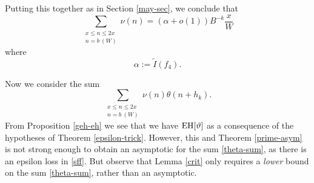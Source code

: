 Putting this together as in Section \ref{may-sec}, we conclude that
$$ \sum_{\substack{x \leq n \leq 2x\\ n = b\ (W)}} \nu(n) = (\alpha + o(1)) B^{-k} \frac{x}{W}$$
where 
$$ \alpha := \tilde I(f_4).$$

Now we consider the sum
\begin{equation}\label{theta-sum}
 \sum_{\substack{x \leq n \leq 2x\\ n = b\ (W)}} \nu(n) \theta(n+h_k).
\end{equation}
From Proposition \ref{geh-eh} we see that we have $\operatorname*{EH}[\vartheta]$ as a consequence of the hypotheses of Theorem \ref{epsilon-trick}.  However, this and Theorem \ref{prime-asym} is not strong enough to obtain an asymptotic for the sum \eqref{theta-sum}, as there is an epsilon loss in \eqref{sff}.  But observe that Lemma \ref{crit} only requires a \emph{lower} bound on the sum \eqref{theta-sum}, rather than an asymptotic. 

